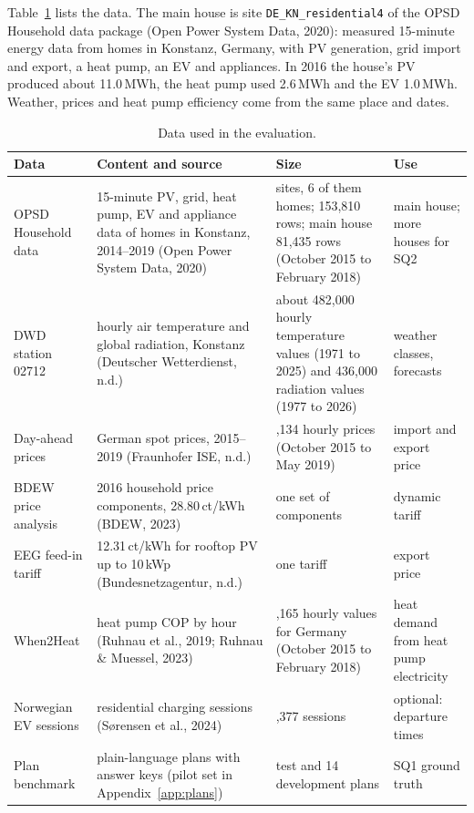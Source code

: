 \documentclass[12pt,a4paper]{report}
\begin{document}
Table~\ref{tab:data} lists the data. The main house is site
\texttt{DE\_KN\_residential4} of the OPSD Household data package
(Open Power System Data, 2020): measured 15-minute energy data from homes in
Konstanz, Germany, with PV generation, grid import and export, a heat
pump, an EV and appliances. In 2016 the house's PV produced about
11.0\,MWh, the heat pump used 2.6\,MWh and the EV 1.0\,MWh. Weather,
prices and heat pump efficiency come from the same place and dates.

\begin{table}[!ht]
\caption{Data used in the evaluation.}
\label{tab:data}
\small
\begin{tabularx}{\textwidth}{@{}>{\raggedright\arraybackslash}p{2.5cm}X>{\raggedright\arraybackslash}p{3.8cm}>{\raggedright\arraybackslash}p{2.6cm}@{}}
\toprule
Data & Content and source & Size & Use \\
\midrule
OPSD Household data & 15-minute PV, grid, heat pump, EV and appliance data of homes in Konstanz, 2014--2019 (Open Power System Data, 2020) & 11 sites, 6 of them homes; 153,810 rows; main house 81,435 rows (October 2015 to February 2018) & main house; more houses for SQ2 \\DWD station 02712 & hourly air temperature and global radiation, Konstanz (Deutscher Wetterdienst, n.d.) & about 482,000 hourly temperature values (1971 to 2025) and 436,000 radiation values (1977 to 2026) & weather classes, forecasts \\Day-ahead prices & German spot prices, 2015--2019 (Fraunhofer ISE, n.d.) & 32,134 hourly prices (October 2015 to May 2019) & import and export price \\BDEW price analysis & 2016 household price components, 28.80\,ct/kWh (BDEW, 2023) & one set of components & dynamic tariff \\EEG feed-in tariff & 12.31\,ct/kWh for rooftop PV up to 10\,kWp (Bundesnetzagentur, n.d.) & one tariff & export price \\When2Heat & heat pump COP by hour (Ruhnau et al., 2019; Ruhnau \& Muessel, 2023) & 21,165 hourly values for Germany (October 2015 to February 2018) & heat demand from heat pump electricity \\Norwegian EV sessions & residential charging sessions (Sørensen et al., 2024) & 35,377 sessions & optional: departure times \\Plan benchmark & plain-language plans with answer keys (pilot set in Appendix~\ref{app:plans}) & 22 test and 14 development plans & SQ1 ground truth \\
\bottomrule
\end{tabularx}
\end{table}
\end{document}
